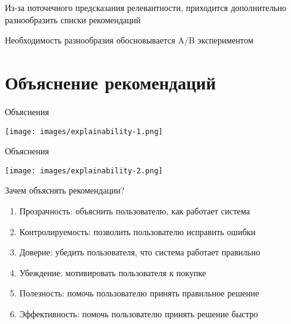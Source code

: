 \documentclass[11pt,aspectratio=169,handout]{beamer}
\begin{document}
\begin{frame}{}

\begin{tcolorbox}[colback=info!5,colframe=info!80,title=]
Из-за поточечного предсказания релевантности, приходится дополнительно разнообразить списки рекомендаций
\end{tcolorbox}

\begin{tcolorbox}[colback=info!5,colframe=info!80,title=]
Необходимость разнообразия обосновывается A/B экспериментом
\end{tcolorbox}

\end{frame}

\section{Объяснение рекомендаций}

\begin{frame}{Объяснения}

\begin{center}
\texttt{[image: images/explainability-1.png]}
\end{center}

\end{frame}

\begin{frame}{Объяснения}

\begin{center}
\texttt{[image: images/explainability-2.png]}
\end{center}

\end{frame}

\begin{frame}{Зачем объяснять рекомендации?}

\begin{enumerate}[<+->]
\item Прозрачность: объяснить пользователю, как работает система
\item Контролируемость: позволить пользователю исправить ошибки
\item Доверие: убедить пользователя, что система работает правильно
\item Убеждение: мотивировать пользователя к покупке
\item Полезность: помочь пользователю принять правильное решение
\item Эффективность: помочь пользователю принять решение быстро
\end{enumerate}

\end{frame}
\end{document}
